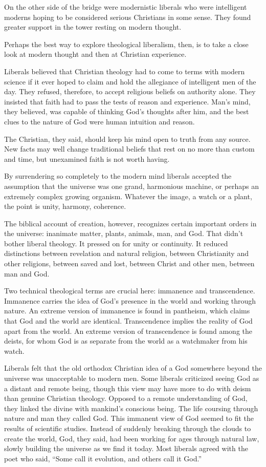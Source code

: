 On the other side of the bridge were modernistic liberals who were intelligent moderns hoping to be
considered serious Christians in some sense. They found greater support in the tower resting on
modern thought.

Perhaps the best way to explore theological liberalism, then, is to take a close look at modern
thought and then at Christian experience.

Liberals believed that Christian theology had to come to terms with modern science if it ever hoped
to claim and hold the allegiance of intelligent men of the day. They refused, therefore, to accept
religious beliefs on authority alone. They insisted that faith had to pass the tests of reason and
experience. Man’s mind, they believed, was capable of thinking God’s thoughts after him, and the
best clues to the nature of God were human intuition and reason.

The Christian, they said, should keep his mind open to truth from any source. New facts may well
change traditional beliefs that rest on no more than custom and time, but unexamined faith is not
worth having.

By surrendering so completely to the modern mind liberals accepted the assumption that the universe
was one grand, harmonious machine, or perhaps an extremely complex growing organism. Whatever the
image, a watch or a plant, the point is unity, harmony, coherence.

The biblical account of creation, however, recognizes certain important orders in the universe:
inanimate matter, plants, animals, man, and God. That didn’t bother liberal theology. It pressed on
for unity or continuity. It reduced distinctions between revelation and natural religion, between
Christianity and other religions, between saved and lost, between Christ and other men, between man
and God.

Two technical theological terms are crucial here: immanence and transcendence. Immanence carries the
idea of God’s presence in the world and working through nature. An extreme version of immanence is
found in pantheism, which claims that God and the world are identical. Transcendence implies the
reality of God apart from the world. An extreme version of transcendence is found among the deists,
for whom God is as separate from the world as a watchmaker from his watch.

Liberals felt that the old orthodox Christian idea of a God somewhere beyond the universe was
unacceptable to modern men. Some liberals criticized seeing God as a distant and remote being,
though this view may have more to do with deism than genuine Christian theology. Opposed to a remote
understanding of God, they linked the divine with mankind’s conscious being. The life coursing
through nature and man they called God. This immanent view of God seemed to fit the results of
scientific studies. Instead of suddenly breaking through the clouds to create the world, God, they
said, had been working for ages through natural law, slowly building the universe as we find it
today. Most liberals agreed with the poet who said, “Some call it evolution, and others call it
God.”

